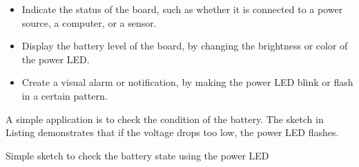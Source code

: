 \begin{itemize}
	\item Indicate the status of the board, such as whether it is connected to a power source, a computer, or a sensor.
	\item Display the battery level of the board, by changing the brightness or color of the power LED.
	\item Create a visual alarm or notification, by making the power LED blink or flash in a certain pattern.
\end{itemize}

A simple application is to check the condition of the battery. The sketch in Listing demonstrates that if the voltage drops too low, the power LED flashes.

\begin{code}
	
	
	\caption{Simple sketch to check the battery state using the power LED}\label{TestLEDPowerBattery.ino}
\end{code}